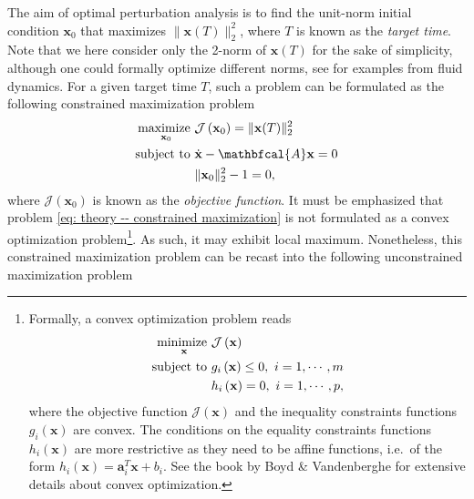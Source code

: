       The aim of optimal perturbation analysis is to find the unit-norm initial condition $\mathbf{x}_0$ that maximizes $\| \mathbf{x}(T) \|_2^2$, where $T$ is known as the \emph{target time}. Note that we here consider only the 2-norm of $\mathbf{x}(T)$ for the sake of simplicity, although one could formally optimize different norms, see \cite{FCS2012, jfm:foures:2013, jfm:foures:2014, fdr:farano:2016} for examples from fluid dynamics. For a given target time $T$, such a problem can be formulated as the following constrained maximization problem
      \begin{equation}
          \begin{aligned}
            \maximize \limits_{\mathbf{x}_0} & \mathcal{J} \left( \mathbf{x}_0 \right) = \| \mathbf{x}(T) \|_2^2\\
            \subjecto & \dot{\mathbf{x}} - \mathbfcal{A}\mathbf{x} = 0 \\
            ~ & \| \mathbf{x}_0 \|_2^2 - 1 = 0,
          \end{aligned}
          \label{eq: theory -- constrained maximization}
      \end{equation}
      where $\mathcal{J}(\mathbf{x}_{0})$ is known as the \emph{objective function}. It must be emphasized that problem \eqref{eq: theory -- constrained maximization} is not formulated as a convex optimization problem\footnote{
      Formally, a convex optimization problem reads
      \begin{equation}
        \begin{aligned}
          \operatorname*{minimize~} \limits_{\mathbf{x}} & \mathcal{J} \left( \mathbf{x} \right) \\
          \operatorname{subject~to~} & g_i \left( \mathbf{x} \right) \leq 0, \ i = 1, \cdots, m \\
          ~ & h_i \left( \mathbf{x} \right) = 0, \ i = 1, \cdots, p,
        \end{aligned}
        \notag
      \end{equation}
      where the objective function $\mathcal{J} \left( \mathbf{x} \right)$ and the inequality constraints functions $g_i \left( \mathbf{x} \right)$ are convex. The conditions on the equality constraints functions $h_i \left( \mathbf{x} \right)$ are more restrictive as they need to be affine functions, i.e.\ of the form $h_i \left( \mathbf{x} \right) = \mathbf{a}_i^T \mathbf{x} + b_i$. See the book by Boyd \& Vandenberghe \cite{book:boyd:2004} for extensive details about convex optimization.}.
      As such, it may exhibit local maximum. Nonetheless, this constrained maximization problem can be recast into the following unconstrained maximization problem
